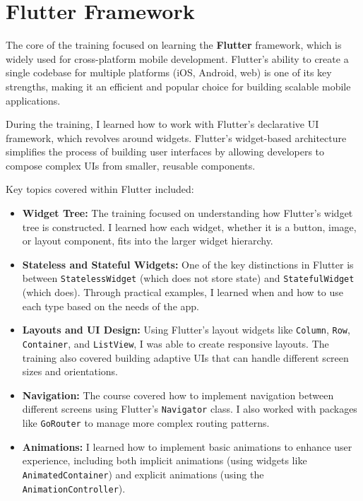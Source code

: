 \documentclass[12pt,a4paper]{report}
\begin{document}
\section{Flutter Framework}
The core of the training focused on learning the \textbf{Flutter} framework, which is widely used for cross-platform mobile development. Flutter's ability to create a single codebase for multiple platforms (iOS, Android, web) is one of its key strengths, making it an efficient and popular choice for building scalable mobile applications.

During the training, I learned how to work with Flutter's declarative UI framework, which revolves around widgets. Flutter’s widget-based architecture simplifies the process of building user interfaces by allowing developers to compose complex UIs from smaller, reusable components.

Key topics covered within Flutter included:
\begin{itemize}
    \item \textbf{Widget Tree:} The training focused on understanding how Flutter’s widget tree is constructed. I learned how each widget, whether it is a button, image, or layout component, fits into the larger widget hierarchy.
    \item \textbf{Stateless and Stateful Widgets:} One of the key distinctions in Flutter is between \texttt{StatelessWidget} (which does not store state) and \texttt{StatefulWidget} (which does). Through practical examples, I learned when and how to use each type based on the needs of the app.
    \item \textbf{Layouts and UI Design:} Using Flutter’s layout widgets like \texttt{Column}, \texttt{Row}, \texttt{Container}, and \texttt{ListView}, I was able to create responsive layouts. The training also covered building adaptive UIs that can handle different screen sizes and orientations.
    \item \textbf{Navigation:} The course covered how to implement navigation between different screens using Flutter’s \texttt{Navigator} class. I also worked with packages like \texttt{GoRouter} to manage more complex routing patterns.
    \item \textbf{Animations:} I learned how to implement basic animations to enhance user experience, including both implicit animations (using widgets like \texttt{AnimatedContainer}) and explicit animations (using the \texttt{AnimationController}).
\end{itemize}
\end{document}
